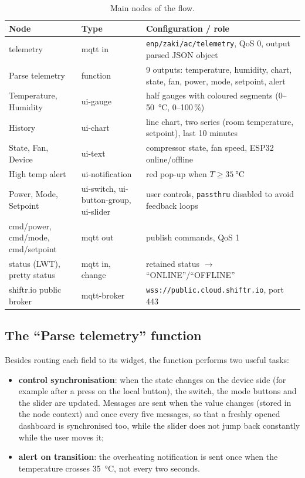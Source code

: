 \documentclass[11pt,a4paper]{article}
\newcommand{\topic}[1]{\texttt{\small #1}}
\begin{document}
\begin{table}[H]
\centering\small
\caption{Main nodes of the flow.}
\label{tab:nodes}
\begin{tabularx}{\linewidth}{@{}>{\raggedright\arraybackslash}p{3.6cm} >{\raggedright\arraybackslash}p{3.0cm} X@{}}
\toprule
\textbf{Node} & \textbf{Type} & \textbf{Configuration / role} \\
\midrule
telemetry & mqtt in & \topic{enp/zaki/ac/telemetry}, QoS 0, output parsed JSON object \\
Parse telemetry & function & 9 outputs: temperature, humidity, chart, state, fan, power,
  mode, setpoint, alert \\
Temperature, Humidity & ui-gauge & half gauges with coloured segments (0--\SI{50}{\celsius}, 0--100\,\%) \\
History & ui-chart & line chart, two series (room temperature, setpoint), last 10 minutes \\
State, Fan, Device & ui-text & compressor state, fan speed, ESP32 online/offline \\
High temp alert & ui-notification & red pop-up when $T \ge \SI{35}{\celsius}$ \\
Power, Mode, Setpoint & ui-switch, ui-button-group, ui-slider & user controls,
  \texttt{passthru} disabled to avoid feedback loops \\
cmd/power, cmd/mode, cmd/setpoint & mqtt out & publish commands, QoS 1 \\
status (LWT), pretty status & mqtt in, change & retained status $\to$ ``ONLINE''/``OFFLINE'' \\
shiftr.io public broker & mqtt-broker & \texttt{wss://public.cloud.shiftr.io}, port 443 \\
\bottomrule
\end{tabularx}
\end{table}

\subsection{The ``Parse telemetry'' function}
Besides routing each field to its widget, the function performs two useful tasks:
\begin{itemize}
  \item \textbf{control synchronisation}: when the state changes on the device side (for example
        after a press on the local button), the switch, the mode buttons and the slider are
        updated. Messages are sent when the value changes (stored in the node context) and
        once every five messages, so that a freshly opened dashboard is synchronised too,
        while the slider does not jump back constantly while the user moves it;
  \item \textbf{alert on transition}: the overheating notification is sent once when the
        temperature crosses \SI{35}{\celsius}, not every two seconds.
\end{itemize}
\end{document}
